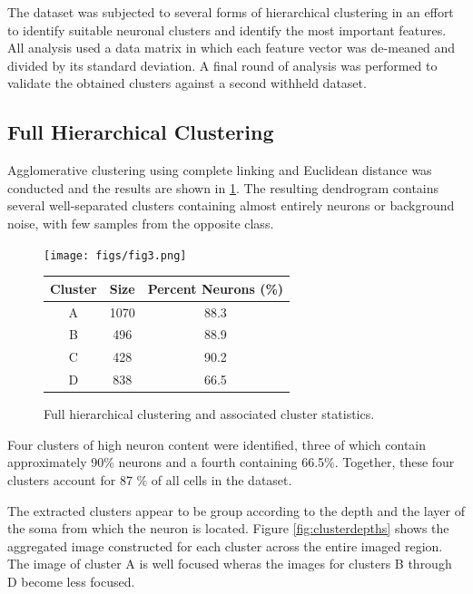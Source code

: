 \documentclass[10pt]{article}
\begin{document}
The dataset was subjected to several forms of hierarchical clustering in an effort to identify suitable neuronal clusters and identify the most important features. 
All analysis used a data matrix in which each feature vector was de-meaned and divided by its standard deviation.
A final round of analysis was performed to validate the obtained clusters against a second withheld dataset.

\subsection{Full Hierarchical Clustering}

Agglomerative clustering using complete linking and Euclidean distance was conducted and the results are shown in \cref{fig:fullhierarchical}.
The resulting dendrogram contains several well-separated clusters containing almost entirely neurons or background noise, with few samples from the opposite class.

\begin{figure}[h]
    \centering

    \begin{minipage}{0.6\textwidth}
      \centering
      \texttt{[image: figs/fig3.png]}
    \end{minipage}
    \begin{minipage}{0.38\textwidth}
      \centering
      \footnotesize
      \begin{tabular}{cSS}
        \toprule
        Cluster & {Size} & {Percent Neurons (\%)} \\
        \midrule
        A & 1070 & 88.3 \\
        B &  496 & 88.9 \\
        C &  428 & 90.2 \\
        D &  838 & 66.5 \\
        \bottomrule
      \end{tabular}
    \end{minipage}
    \caption{\footnotesize Full hierarchical clustering and associated cluster statistics.}
    \label{fig:fullhierarchical}
\end{figure}

Four clusters of high neuron content were identified, three of which contain approximately \num{90}\% neurons and a fourth containing \num{66.5}\%. Together, these four clusters account for \num{87}
\% of all cells in the dataset.

The extracted clusters appear to be group according to the depth and the layer of the soma from which the neuron is located. 
Figure \cref{fig:clusterdepths} shows the aggregated image constructed for each cluster across the entire imaged region. 
The image of cluster A is well focused wheras the images for clusters B through D become less focused. 
\end{document}

